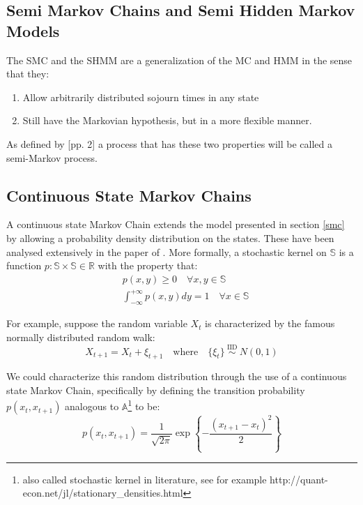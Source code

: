 \documentclass[a4paper,12pt]{article}
\theoremstyle{definition}
\begin{document}
\subsection{Semi Markov Chains and Semi Hidden Markov Models}
The SMC and the SHMM are a generalization of the MC and HMM in the sense that they:
\begin{enumerate}
\item Allow arbitrarily distributed sojourn times in any state
\item Still have the Markovian hypothesis, but in a more flexible manner.
\end{enumerate}
As defined by \cite{barbu08}[pp. 2] a process that has these two properties will be called a semi-Markov process.


\subsection{Continuous State Markov Chains}
A continuous state Markov Chain extends the model presented in section \ref{smc} by allowing a probability density distribution on the states. These have been analysed extensively in the paper of \cite{benesch2001baum}. 
More formally, a stochastic kernel on $\mathbb{S}$ is a function $p:\mathbb{S}\times \mathbb{S}\in \mathbb{R}$ with the property that:
\begin{align*}
 & p(x, y) \geq 0 \quad \forall x,y \in \mathbb{S} \\ 
 & \int_{-\infty}^{+\infty} p(x, y) dy = 1 \quad\forall x \in \mathbb{S}
\end{align*}

For example, suppose the random variable $X_t$ is characterized by the famous normally distributed random walk:
\begin{equation}\label{eq:RWalkNorm}
X_{t+1} = X_t + \xi_{t+1} \quad \text{where} \quad
\{ \xi_t \} \stackrel {\textrm{ IID }} {\sim} N(0, 1)
\end{equation}

We could characterize this random distribution through the use of a continuous state Markov Chain, specifically by defining the transition probability $p(x_t, x_{t+1})$ analogous to $\mathbb{A}$\footnote{also called stochastic kernel in literature, see for example http://quant-econ.net/jl/stationary\_densities.html} to be:
\begin{equation}
p(x_t, x_{t+1}) = \frac{1}{\sqrt{2 \pi}} \exp \left\{ - \frac{(x_{t+1} - x_t)^2}{2} \right\}
\end{equation}
\end{document}

